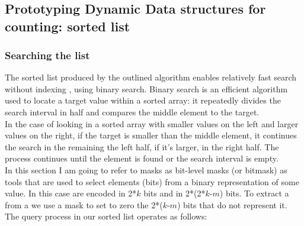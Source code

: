 \chapter{}
\section*{Prototyping Dynamic Data structures for \kmer counting: \skmer sorted list}
\label{skmer_appendix}
\subsection*{Searching the list}
The sorted \skmer list produced by the outlined algorithm enables relatively fast search without indexing \kmers, using binary search. Binary search is an efficient algorithm used to locate a target value within a sorted array: it repeatedly divides the search interval in half and compares the middle element to the target.\\
In the case of looking in a sorted array with smaller values on the left and larger values on the right, if the target is smaller than the middle element, it continues the search in the remaining the left half, if it's larger, in the right half. The process continues until the element is found or the search interval is empty.\\
In this section I am going to refer to masks as bit-level masks (or bitmask) as tools that are used to select elements (bits) from a binary representation of some value. In this case \kmers are encoded in 2*$k$ bits and \skmers in 2*(2*$k$-$m$) bits. To extract a \kmer from a \skmer we use a mask to set to zero the 2*($k$-$m$) bits that do not represent it.
The \kmer query process in our sorted \skmer list operates as follows:
